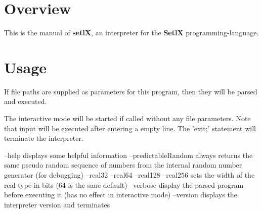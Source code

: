\def\myDocumentTypeArticle{-}


\globalDate{\today}






\begin{titlepage}
\maketitle
\vfill
\tableofcontents
\end{titlepage}

\section{Overview}

This is the manual of \textbf{setlX}, an interpreter for the \textbf{SetlX} programming-language.

\section{Usage}
    If file paths are supplied as parameters for this program, then they will be
    parsed and executed.

    The interactive mode will be started if called without any file parameters.
    Note that input will be executed after entering a empty line.
    The 'exit;' statement will terminate the interpreter.

        --help
            displays some helpful information
        --predictableRandom
            always returns the same pseudo random sequence of numbers from the
            internal random number generator (for debugging)
        --real32
        --real64
        --real128
        --real256
            sets the width of the real-type in bits (64 is the sane default)
        --verbose
            display the parsed program before executing it
            (has no effect in interactive mode)
        --version
            displays the interpreter version and terminates

